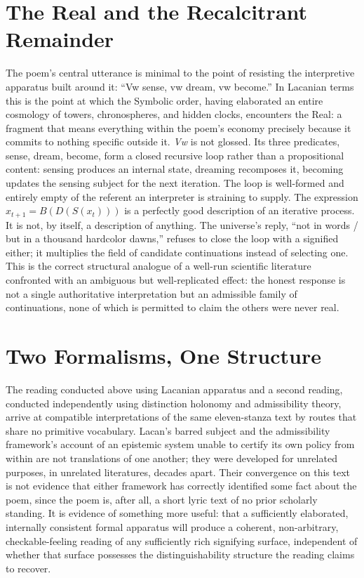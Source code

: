 \section{The Real and the Recalcitrant Remainder}

The poem's central utterance is minimal to the point of resisting the interpretive apparatus built around it: ``Vw sense, vw dream, vw become.'' In Lacanian terms this is the point at which the Symbolic order, having elaborated an entire cosmology of towers, chronospheres, and hidden clocks, encounters the Real: a fragment that means everything within the poem's economy precisely because it commits to nothing specific outside it. \emph{Vw} is not glossed. Its three predicates, sense, dream, become, form a closed recursive loop rather than a propositional content: sensing produces an internal state, dreaming recomposes it, becoming updates the sensing subject for the next iteration. The loop is well-formed and entirely empty of the referent an interpreter is straining to supply. The expression $x_{t+1} = B(D(S(x_t)))$ is a perfectly good description of an iterative process. It is not, by itself, a description of anything. The universe's reply, ``not in words / but in a thousand hardcolor dawns,'' refuses to close the loop with a signified either; it multiplies the field of candidate continuations instead of selecting one. This is the correct structural analogue of a well-run scientific literature confronted with an ambiguous but well-replicated effect: the honest response is not a single authoritative interpretation but an admissible family of continuations, none of which is permitted to claim the others were never real.

\section{Two Formalisms, One Structure}

The reading conducted above using Lacanian apparatus and a second reading, conducted independently using distinction holonomy and admissibility theory, arrive at compatible interpretations of the same eleven-stanza text by routes that share no primitive vocabulary. Lacan's barred subject and the admissibility framework's account of an epistemic system unable to certify its own policy from within are not translations of one another; they were developed for unrelated purposes, in unrelated literatures, decades apart. Their convergence on this text is not evidence that either framework has correctly identified some fact about the poem, since the poem is, after all, a short lyric text of no prior scholarly standing. It is evidence of something more useful: that a sufficiently elaborated, internally consistent formal apparatus will produce a coherent, non-arbitrary, checkable-feeling reading of any sufficiently rich signifying surface, independent of whether that surface possesses the distinguishability structure the reading claims to recover.

